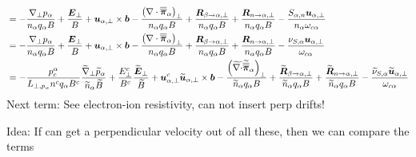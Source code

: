 \begin{align}
&=
- \frac{ \nabla_\perp p_\alpha }{n_\alpha  q_\alpha B}
+ \frac{\boldsymbol{E}_\perp}{B}
+ \boldsymbol{u}_{\alpha,\perp}\times\boldsymbol{b}
- \frac{ \left(\nabla\cdot\boldsymbol{\overline{\overline{\pi}}}_\alpha\right)_\perp }{n_\alpha  q_\alpha B}
+ \frac{ \boldsymbol{R}_{\beta \to \alpha,\perp} }{n_\alpha q_\alpha B}
+ \frac{ \boldsymbol{R}_{n \to \alpha,\perp} }{n_\alpha q_\alpha B}
- \frac{ S_{\alpha,n}\boldsymbol{u}_{\alpha,\perp} }{n_\alpha \omega_{c\alpha}}
\\
&=
- \frac{ \nabla_\perp p_\alpha }{n_\alpha  q_\alpha B}
+ \frac{\boldsymbol{E}_\perp}{B}
+ \boldsymbol{u}_{\alpha,\perp}\times\boldsymbol{b}
- \frac{ \left(\nabla\cdot\boldsymbol{\overline{\overline{\pi}}}_\alpha\right)_\perp }{n_\alpha  q_\alpha B}
+ \frac{ \boldsymbol{R}_{\beta \to \alpha,\perp} }{n_\alpha q_\alpha B}
+ \frac{ \boldsymbol{R}_{n \to \alpha,\perp} }{n_\alpha q_\alpha B}
- \frac{ \nu_{S,\alpha}\boldsymbol{u}_{\alpha,\perp} }{\omega_{c\alpha}}
\\
&=
- \frac{p^\alpha_c}{L_{\perp, p_\alpha}n^cq_\alpha B^c}
\frac{ \widetilde{ \nabla}_\perp \widetilde{ p}_\alpha }{\widetilde{ n}_\alpha \widetilde{ B}}
+ \frac{E_\perp^c}{B^c}
\frac{\widetilde{ \boldsymbol{E}}_\perp}{\widetilde{ B}}
+ \boldsymbol{u}^c_{\alpha,\perp}
\widetilde{ \boldsymbol{u}}_{\alpha,\perp}\times\boldsymbol{b}
- \frac{ \left(\widetilde{ \nabla\cdot}\widetilde{ \boldsymbol{\overline{\overline{\pi}}}}_\alpha\right)_\perp }{\widetilde{ n}_\alpha  q_\alpha B}
+ \frac{ \widetilde{ \boldsymbol{R}}_{\beta \to \alpha,\perp} }{\widetilde{ n}_\alpha q_\alpha B}
+ \frac{ \widetilde{ \boldsymbol{R}}_{n \to \alpha,\perp} }{\widetilde{ n}_\alpha q_\alpha B}
- \frac{ \widetilde{ \nu}_{S,\alpha}\widetilde{ \boldsymbol{u}}_{\alpha,\perp} }{\omega_{c\alpha}}
\end{align}
%
Next term: See electron-ion resistivity, can not insert perp drifts!

Idea: If can get a perpendicular velocity out of all these, then we can compare
the terms
